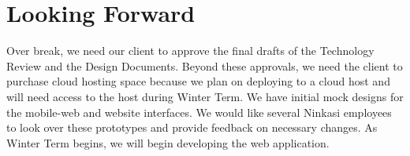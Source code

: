 \documentclass[draftclsnofoot,onecolumn,letterpaper,10pt,compsoc]{IEEEtran}
\begin{document}
\section{Looking Forward}
Over break, we need our client to approve the final drafts of the Technology Review and the Design Documents.
Beyond these approvals, we need the client to purchase cloud hosting space because we plan on deploying to a cloud host and will need access to the host during Winter Term.
We have initial mock designs for the mobile-web and website interfaces.
We would like several Ninkasi employees to look over these prototypes and provide feedback on necessary changes.
As Winter Term begins, we will begin developing the web application.
\end{document}
